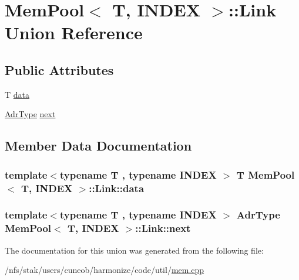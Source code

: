 \hypertarget{unionMemPool_1_1Link}{\section{Mem\-Pool$<$ T, I\-N\-D\-E\-X $>$\-:\-:Link Union Reference}
\label{unionMemPool_1_1Link}
}
\subsection*{Public Attributes}
\begin{DoxyCompactItemize}
\item 
T \hyperlink{unionMemPool_1_1Link_a034e86a1dd789e5f93ea546854095773}{data}
\item 
\hyperlink{structMemPool_a62addfe04ad9f092442cf86863f52fcc}{Adr\-Type} \hyperlink{unionMemPool_1_1Link_a85a1558923c9837986fb2ee6908e9a29}{next}
\end{DoxyCompactItemize}


\subsection{Member Data Documentation}
\hypertarget{unionMemPool_1_1Link_a034e86a1dd789e5f93ea546854095773}{
\subsubsection[{data}]{\setlength{\rightskip}{0pt plus 5cm}template$<$typename T , typename I\-N\-D\-E\-X $>$ T {\bf Mem\-Pool}$<$ T, I\-N\-D\-E\-X $>$\-::Link\-::data}}\label{unionMemPool_1_1Link_a034e86a1dd789e5f93ea546854095773}
\hypertarget{unionMemPool_1_1Link_a85a1558923c9837986fb2ee6908e9a29}{
\subsubsection[{next}]{\setlength{\rightskip}{0pt plus 5cm}template$<$typename T , typename I\-N\-D\-E\-X $>$ {\bf Adr\-Type} {\bf Mem\-Pool}$<$ T, I\-N\-D\-E\-X $>$\-::Link\-::next}}\label{unionMemPool_1_1Link_a85a1558923c9837986fb2ee6908e9a29}


The documentation for this union was generated from the following file\-:\begin{DoxyCompactItemize}
\item 
/nfs/stak/users/cuneob/harmonize/code/util/\hyperlink{mem_8cpp}{mem.\-cpp}\end{DoxyCompactItemize}
